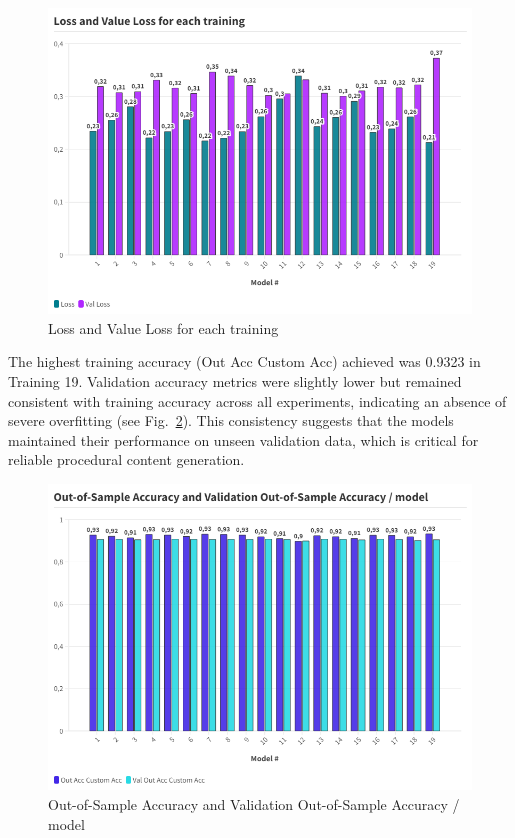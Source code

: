 \documentclass[runningheads]{llncs}
\begin{document}
\begin{figure}
\includegraphics[width=\textwidth]{Loss and Value Loss for each training.png}
\caption{Loss and Value Loss for each training} \label{fig3}
\end{figure}

The highest training accuracy (Out Acc Custom Acc) achieved was 0.9323 in Training 19. Validation accuracy metrics were slightly lower but remained consistent with training accuracy across all experiments, indicating an absence of severe overfitting (see Fig.~\ref{fig4}). This consistency suggests that the models maintained their performance on unseen validation data, which is critical for reliable procedural content generation.

\begin{figure}
\includegraphics[width=\textwidth]{Out-of-Sample Accuracy and Validation Out-of-Sample Accuracy _ model.png}
\caption{Out-of-Sample Accuracy and Validation Out-of-Sample Accuracy / model} \label{fig4}
\end{figure}
\end{document}
